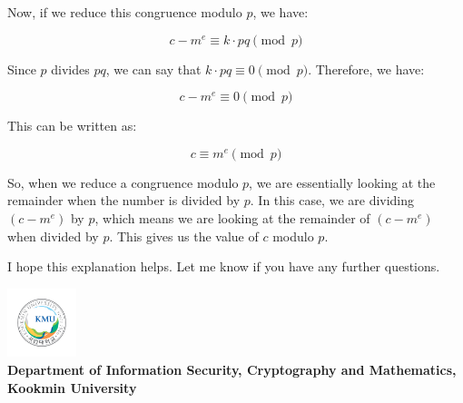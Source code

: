 \documentclass{article}
\newcommand{\footer}[1]{
	\begin{flushright}
		\vspace{2em}
		\includegraphics[width=2cm]{school_logo.jpg} \\
		\vspace{1em}
		\textcolor{blue2}{\small\textbf{#1}}
	\end{flushright}
}
\theoremstyle{definition}
\begin{document}
	Now, if we reduce this congruence modulo $p$, we have:
	
	$$c - m^e \equiv k \cdot pq \pmod p$$
	
	Since $p$ divides $pq$, we can say that $k \cdot pq \equiv 0 \pmod p$. Therefore, we have:
	
	$$c - m^e \equiv 0 \pmod p$$
	
	This can be written as:
	
	$$c \equiv m^e \pmod p$$
	
	So, when we reduce a congruence modulo $p$, we are essentially looking at the remainder when the number is divided by $p$. In this case, we are dividing $(c - m^e)$ by $p$, which means we are looking at the remainder of $(c - m^e)$ when divided by $p$. This gives us the value of $c$ modulo $p$.
	
	I hope this explanation helps. Let me know if you have any further questions.
	\newpage
	\footer{Department of Information Security, Cryptography and Mathematics, Kookmin University}
\end{document}
